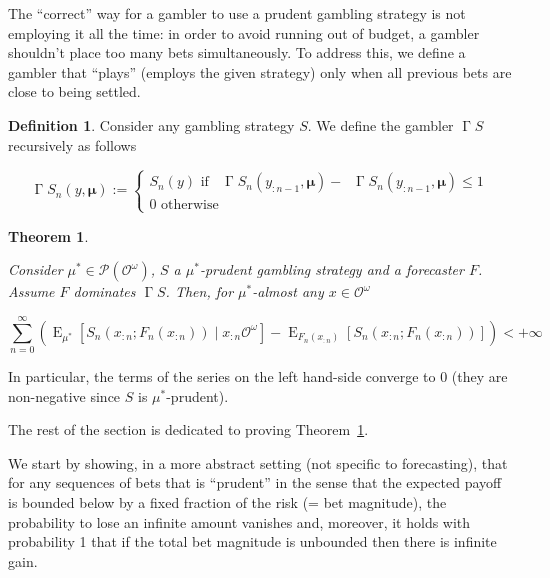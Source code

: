 \documentclass[11pt]{article}
\theoremstyle{definition}
\newtheorem{definition}{Definition}%
\theoremstyle{plain}
\newtheorem{theorem}{Theorem}%
\DeclareMathOperator{\E}{E}
\newcommand{\PM}{\mathcal{P}}
\newcommand{\Ob}{\mathcal{O}}
\newcommand{\OO}{\Ob^\omega}
\newcommand{\PMO}{\PM(\OO)}
\DeclareMathOperator{\SVM}{\Sigma V_{\min}}
\DeclareMathOperator{\SVX}{\Sigma V_{\max}}
\DeclareMathOperator{\PG}{\Gamma}
\newcommand{\BM}{\bm{\mu}}
\begin{document}
The \enquote{correct} way for a gambler to use a prudent gambling strategy is not employing it all the time: in order to avoid running out of budget, a gambler shouldn’t place too many bets simultaneously. To address this, we define a gambler that \enquote{plays} (employs the given strategy) only when all previous bets are close to being settled.

\begin{definition}

Consider any gambling strategy $S$. We define the gambler $\PG{S}$ recursively as follows

\begin{equation}
\PG{S}_n\left(y,\BM\right):=\begin{cases} S_n\left(y\right) \text{ if } {\SVX{\PG{S}}_n\left(y_{:n-1},\BM\right)}-{\SVM{\PG{S}}_n\left(y_{:n-1},\BM\right)} \leq 1 \\ 0 \text{ otherwise} \end{cases}
\end{equation}

\end{definition}

\begin{theorem}
\label{thm:prudent}

Consider $\mu^* \in \PMO$, $S$ a $\mu^*$-prudent gambling strategy and a forecaster $F$. Assume $F$ dominates $\PG{S}$. Then, for $\mu^*$-almost any $x \in \OO$

\begin{equation}
\label{eqn:thm_prudent}
\sum_{n=0}^\infty \left(\E_{\mu^*}[S_n\left(x_{:n};F_n\left(x_{:n}\right)\right) \mid x_{:n}\OO]-\E_{F_n\left(x_{:n}\right)}[S_n\left(x_{:n};F_n\left(x_{:n}\right)\right)]\right) < +\infty
\end{equation}

\end{theorem}

In particular, the terms of the series on the left hand-side converge to 0 (they are non-negative since $S$ is $\mu^*$-prudent).

The rest of the section is dedicated to proving Theorem~\ref{thm:prudent}.

We start by showing, in a more abstract setting (not specific to forecasting), that for any sequences of bets that is \enquote{prudent} in the sense that the expected payoff is bounded below by a fixed fraction of the risk (= bet magnitude), the probability to lose an infinite amount vanishes and, moreover, it holds with probability 1 that if the total bet magnitude is unbounded then there is infinite gain.
\end{document}
